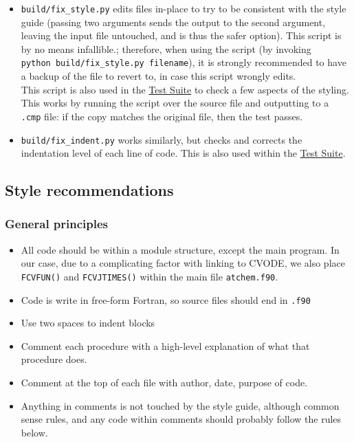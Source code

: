 \begin{itemize}
\item \texttt{build/fix\_style.py} edits files in-place to try to be
  consistent with the style guide (passing two arguments sends the
  output to the second argument, leaving the input file untouched, and
  is thus the safer option). This script is by no means infallible.;
  therefore, when using the script (by invoking \texttt{python\
    build/fix\_style.py\ filename}), it is strongly recommended to
  have a
  backup of the file to revert to, in case this script wrongly edits.\\
  This script is also used in the \hyperref[sec:test-suite]{Test Suite}
  to check a few aspects of the styling. This works by running the
  script over the source file and outputting to a \texttt{.cmp} file:
  if the copy matches the original file, then the test passes.
\item \texttt{build/fix\_indent.py} works similarly, but checks and
  corrects the indentation level of each line of code. This is also
  used within the \hyperref[sec:test-suite]{Test Suite}.
\end{itemize}

\subsection{Style recommendations} \label{subsec:style-recommendations}

\subsubsection{General principles}

\begin{itemize}
\item All code should be within a module structure, except the main
  program. In our case, due to a complicating factor with linking to
  CVODE, we also place \texttt{FCVFUN()} and \texttt{FCVJTIMES()}
  within the main file \texttt{atchem.f90}.
\item Code is write in free-form Fortran, so source files should end
  in \texttt{.f90}
\item Use two spaces to indent blocks
\item Comment each procedure with a high-level explanation of what
  that procedure does.
\item Comment at the top of each file with author, date, purpose of
  code.
\item Anything in comments is not touched by the style guide, although
  common sense rules, and any code within comments should probably
  follow the rules below.
\end{itemize}

